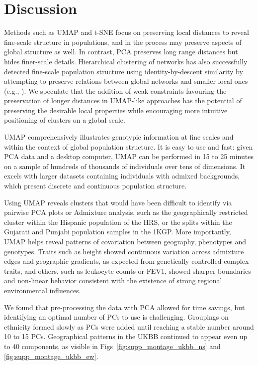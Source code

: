 \section{Discussion}
Methods such as UMAP and t-SNE focus on preserving local distances to reveal fine-scale structure in populations, and in the process may preserve aspects of global structure as well. In contrast, PCA preserves long range distances but hides finer-scale details. Hierarchical clustering of networks has also successfully detected fine-scale population structure using identity-by-descent similarity by attempting to preserve relations between global networks and smaller local ones (e.g., \citep{han2017clustering}). We speculate that the addition of weak constraints favouring the preservation of longer distances in UMAP-like approaches has the potential of preserving the desirable local properties while encouraging more intuitive positioning of clusters on a global scale.

UMAP comprehensively illustrates genotypic information at fine scales and within the context of global population structure. It is easy to use and fast: given PCA data and a desktop computer, UMAP can be performed in 15 to 25 minutes on a sample of hundreds of thousands of individuals over tens of dimensions. It excels with larger datasets containing individuals with admixed backgrounds, which present discrete and continuous population structure.

Using UMAP reveals clusters that would have been difficult to identify via pairwise PCA plots or Admixture analysis, such as the geographically restricted cluster within the Hispanic population of the HRS, or the splits within the Gujarati and Punjabi population samples in the 1KGP. More importantly, UMAP helps reveal patterns of covariation between geography, phenotypes and genotypes. Traits such as height showed continuous variation across admixture edges and geographic gradients, as expected from genetically controlled complex traits, and others, such as leukocyte counts or FEV1, showed sharper boundaries and non-linear behavior consistent with the existence of strong regional environmental influences. 

We found that pre-processing the data with PCA allowed for time savings, but identifying an optimal number of PCs to use is challenging. Groupings on ethnicity formed slowly as PCs were added until reaching a stable number around 10 to 15 PCs. Geographical patterns in the UKBB continued to appear even up to 40 components, as visible in Figs~\ref{fig:supp_montage_ukbb_ns} and \ref{fig:supp_montage_ukbb_ew}. 

